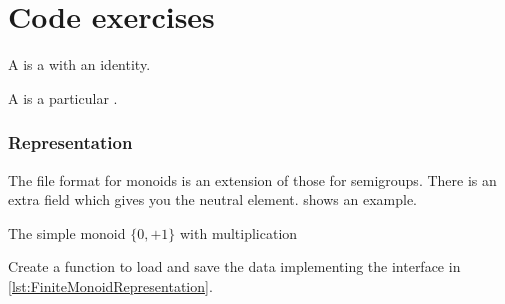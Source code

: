 
\section{\usebox{\chaptergear}
  Code exercises}

A \Monoid is a \Semigroup with an identity.


A \FiniteMonoid is a particular \FiniteSemigroup.


\subsubsection*{Representation}

The file format for monoids is an extension of those for semigroups.
There is an extra field  which gives you the neutral element.
 shows an example.

\begin{marginfigure}%
    \caption{The simple monoid $\{0,+1\}$ with multiplication}%
    \label{fig:monoid2}%
\end{marginfigure}%

\begin{codeexercise}
    Create a function to load and save the data implementing the
    interface in \cref{lst:FiniteMonoidRepresentation}.
\end{codeexercise}


